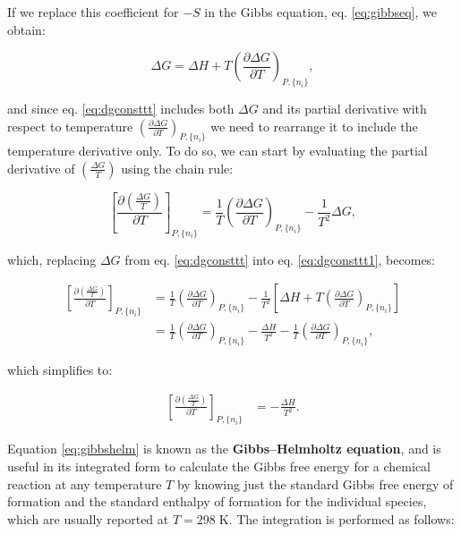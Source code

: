\documentclass[
  9pt,
]{extbook}
\theoremstyle{definition}
\theoremstyle{definition}
\theoremstyle{definition}
\theoremstyle{remark}
\begin{document}
If we replace this coefficient for \(-S\) in the Gibbs equation, eq. \eqref{eq:gibbseq}, we obtain:

\begin{equation}
\Delta G = \Delta H + T \left(\frac{\partial \Delta G}{\partial T} \right)_{P,\{n_i\}},
\label{eq:dgconsttt}
\end{equation}

and since eq. \eqref{eq:dgconsttt} includes both \(\Delta G\) and its partial derivative with respect to temperature \(\left(\frac{\partial \Delta G}{\partial T} \right)_{P,\{n_i\}}\) we need to rearrange it to include the temperature derivative only. To do so, we can start by evaluating the partial derivative of \(\left( \frac{\Delta G}{T} \right)\) using the chain rule:

\begin{equation}
\left[ \frac{\partial\left( \frac{\Delta G}{T} \right)}{\partial T} \right]_{P,\{n_i\}} = \frac{1}{T} \left(\frac{\partial \Delta G}{\partial T}  \right)_{P,\{n_i\}} - \frac{1}{T^2}\Delta G,
\label{eq:dgconsttt1}
\end{equation}

which, replacing \(\Delta G\) from eq. \eqref{eq:dgconsttt} into eq. \eqref{eq:dgconsttt1}, becomes:

\begin{equation}
\begin{aligned}
\left[ \frac{\partial\left( \frac{\Delta G}{T} \right)}{\partial T} \right]_{P,\{n_i\}} &= \frac{1}{T} \left(\frac{\partial \Delta G}{\partial T}  \right)_{P,\{n_i\}} - \frac{1}{T^2} \left[ \Delta H + T \left(\frac{\partial \Delta G}{\partial T} \right)_{P,\{n_i\}} \right] \\
&= \frac{1}{T} \left(\frac{\partial \Delta G}{\partial T}  \right)_{P,\{n_i\}}- \frac{\Delta H}{T^2}-\frac{1}{T} \left(\frac{\partial \Delta G}{\partial T}  \right)_{P,\{n_i\}},
\end{aligned}
\label{eq:dgconsttt2}
\end{equation}

which simplifies to:

\begin{equation}
\begin{aligned}
\left[ \frac{\partial\left( \frac{\Delta G}{T} \right)}{\partial T} \right]_{P,\{n_i\}} &= - \frac{\Delta H}{T^2}.
\end{aligned}
\label{eq:gibbshelm}
\end{equation}

Equation \eqref{eq:gibbshelm} is known as the \textbf{Gibbs--Helmholtz equation}, and is useful in its integrated form to calculate the Gibbs free energy for a chemical reaction at any temperature \(T\) by knowing just the standard Gibbs free energy of formation and the standard enthalpy of formation for the individual species, which are usually reported at \(T=298\;\text{K}\). The integration is performed as follows:
\end{document}
